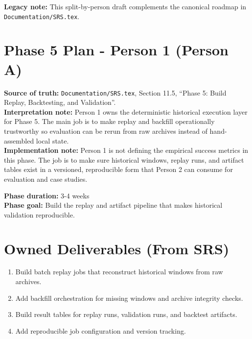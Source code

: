 \documentclass{article}
\begin{document}
\textbf{Legacy note:} This split-by-person draft complements the canonical roadmap in \texttt{Documentation/SRS.tex}.\\

\section*{Phase 5 Plan - Person 1 (Person A)}

\textbf{Source of truth:} \texttt{Documentation/SRS.tex}, Section 11.5, ``Phase 5: Build Replay, Backtesting, and Validation''.\\
\textbf{Interpretation note:} Person 1 owns the deterministic historical execution layer for Phase 5. The main job is to make replay and backfill operationally trustworthy so evaluation can be rerun from raw archives instead of hand-assembled local state.\\
\textbf{Implementation note:} Person 1 is not defining the empirical success metrics in this phase. The job is to make sure historical windows, replay runs, and artifact tables exist in a versioned, reproducible form that Person 2 can consume for evaluation and case studies.

\textbf{Phase duration:} 3-4 weeks\\
\textbf{Phase goal:} Build the replay and artifact pipeline that makes historical validation reproducible.

\section*{Owned Deliverables (From SRS)}
\begin{enumerate}
\item Build batch replay jobs that reconstruct historical windows from raw archives.
\item Add backfill orchestration for missing windows and archive integrity checks.
\item Build result tables for replay runs, validation runs, and backtest artifacts.
\item Add reproducible job configuration and version tracking.
\end{enumerate}
\end{document}
